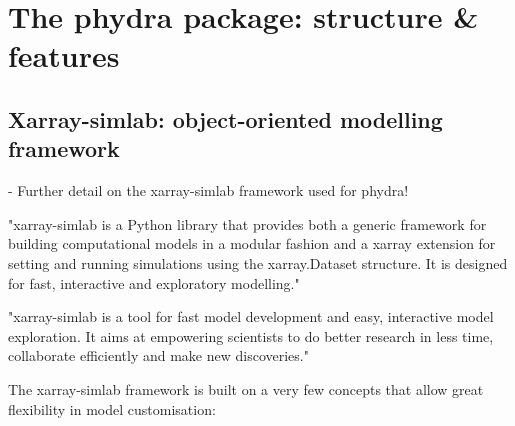 \documentclass[template.tex]{subfiles}
\begin{document}
\section{The phydra package: structure \& features} \label{Section:phydrapackage}

\subsection{Xarray-simlab: object-oriented modelling framework}
- Further detail on the xarray-simlab framework used for phydra!

"xarray-simlab is a Python library that provides both a generic framework for building computational models in a modular fashion and a xarray extension for setting and running simulations using the xarray.Dataset structure. It is designed for fast, interactive and exploratory modelling."

"xarray-simlab is a tool for fast model development and easy, interactive model exploration. It aims at empowering scientists to do better research in less time, collaborate efficiently and make new discoveries."

The xarray-simlab framework is built on a very few concepts that allow great flexibility in model customisation:
\end{document}
